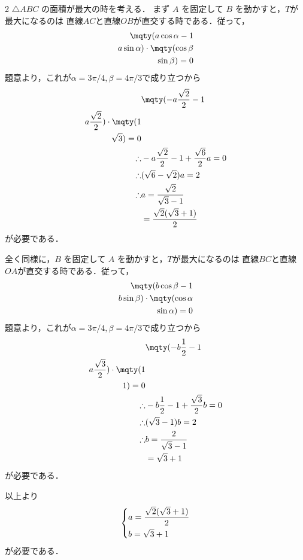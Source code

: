 \documentclass[../../main.tex]{subfiles}
\begin{document}
\begin{multicols}{2}
  $\triangle ABC$ の面積が最大の時を考える．
  まず $A$ を固定して $B$ を動かすと，$T$が最大になるのは
  直線$AC$と直線$OB$が直交する時である．従って，
  \begin{align*}
    \mqty(a\cos\alpha-1 \\ a\sin\alpha) \cdot \mqty( \cos\beta \\ \sin\beta) = 0
  \end{align*}
  題意より，これが$\alpha=3\pi/4, \beta=4\pi/3$で成り立つから
  \begin{align*}
               & \mqty(-a\frac{\sqrt{2}}{2}-1                     \\ a\frac{\sqrt{2}}{2}) \cdot \mqty( 1              \\ \sqrt{3}) = 0 \\
    \therefore & -a\frac{\sqrt{2}}{2}-1 + \frac{\sqrt{6}}{2}a = 0 \\
    \therefore & (\sqrt{6}-\sqrt{2})a = 2                         \\
    \therefore & a = \frac{\sqrt{2}}{\sqrt{3}-1}                  \\
               & = \frac{\sqrt{2}(\sqrt{3}+1)}{2}
  \end{align*}
  が必要である．

  全く同様に，$B$ を固定して $A$ を動かすと，$T$が最大になるのは
  直線$BC$と直線$OA$が直交する時である．従って，
  \begin{align*}
    \mqty(b\cos\beta-1 \\ b\sin\beta) \cdot \mqty( \cos\alpha \\ \sin\alpha) = 0
  \end{align*}
  題意より，これが$\alpha=3\pi/4, \beta=4\pi/3$で成り立つから
  \begin{align*}
               & \mqty(-b\frac{1}{2}-1                     \\ a\frac{\sqrt{3}}{2}) \cdot \mqty( 1 \\ 1) = 0 \\
    \therefore & -b\frac{1}{2}-1 + \frac{\sqrt{3}}{2}b = 0 \\
    \therefore & (\sqrt{3}-1)b = 2                         \\
    \therefore & b = \frac{2}{\sqrt{3}-1}                  \\
               & = \sqrt{3}+1
  \end{align*}
  が必要である．

  以上より
  \begin{align*}
    \begin{dcases}
      a =  \frac{\sqrt{2}(\sqrt{3}+1)}{2} \\
      b = \sqrt{3}+1
    \end{dcases}
  \end{align*}
  が必要である．


\end{multicols}
\end{document}
